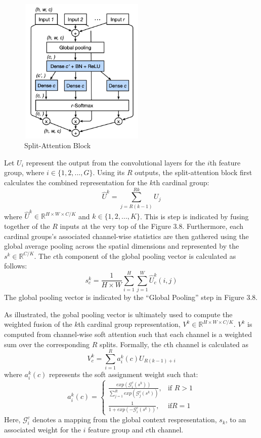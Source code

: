 \documentclass [MAS] {uclathes}
\begin{document}
\begin{figure}[h]
\centering
\includegraphics[height = 70mm, width= 60mm]{imgs/split_att.png}
\caption{Split-Attention Block}
\label{fig:split_att_block}
\end{figure}


Let $U_i$ represent the output from the convolutional layers for the $i$th feature group, where $i \in \{1, 2, ..., G \}$. Using its $R$ outputs, the split-attention block first calculates the combined representation for the $k$th cardinal group: $$\hat{U}^k = \sum_{j = R(k-1)}^{Rk} U_j$$ where $\hat{U}^k \in \mathbb{R}^{H \times W \times C/K}$ and $k \in \{1, 2, ..., K\}$. This is step is indicated by fusing together of the $R$ inputs at the very top of the Figure 3.8. Furthermore, each cardinal groups's associated channel-wise statistics are then gathered using the global average pooling across the spatial dimensions and represented by the $s^k \in \mathbb{R}^{C/K}$. The $c$th component of the global pooling vector is calculated as follows: $$s_{c}^{k} = \frac{1}{H \times W} \sum_{i = 1}^{H} \sum_{j = 1}^{W} \hat{U}_{c}^{k}(i, j)$$ The global pooling vector is indicated by the ``Global Pooling'' step in Figure 3.8. 

As illustrated, the gobal pooling vector is ultimately used to compute the weighted fusion of the $k$th cardinal group 
representation, $V^k \in \mathbb{R}^{H \times W \times C/K}$. $V^k$ is computed from channel-wise soft attention such that each channel is a weighted sum over the corresponding $R$ splits. Formally, the $c$th channel is calculated as $$V_{c}^{k} = \sum_{i = 1}^{R} a_{i}^{k}(c) U_{R(k-1) + i}$$ where $a_{i}^{k}(c)$ represents the soft assignment weight such that: \[  a_{i}^{k}(c)= \begin{cases} \frac{exp(\mathcal{G}_{i}^c(s^k))}{\sum_{j=1}^{R} exp(\mathcal{G}_{j}^c(s^k))}, & \text{if } R > 1\\ \frac{1}{1 + exp(-\mathcal{G}_{i}^c(s^k))}, & \text{if} R = 1 \end{cases} \] Here, $\mathcal{G}_{i}^{c}$ denotes a mapping from the global context respresentation, $s_k$, to an associated weight for the $i$ feature group and $c$th channel. 
\end{document}
